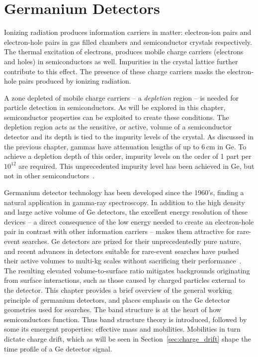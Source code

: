 \chapter{Germanium Detectors}\label{chap:gedet}
Ionizing radiation produces information carriers in matter: electron-ion pairs and electron-hole pairs in gas filled chambers and semiconductor crystals respectively. The thermal excitation of electrons, produces mobile charge carriers (electrons and holes) in semiconductors as well. Impurities in the crystal lattice further contribute to this effect. The presence of these charge carriers masks the electron-hole pairs produced by ionizing radiation. 

A zone depleted of mobile charge carriers -- a \textit{depletion} region -- is needed for particle detection in semiconductors. As will be explored in this chapter, semiconductor properties can be exploited to create these conditions. The depletion region acts as the sensitive, or active, volume of a semiconductor detector and its depth is tied to the impurity levels of the crystal. As discussed in the previous chapter, gammas have attenuation lengths of up to 6\,cm in Ge. To achieve a depletion depth of this order, impurity levels on the order of 1 part per $10^{12}$ are required. This unprecedented impurity level has been achieved in Ge, but not in other semiconductors~\cite{knoll}. 

Germanium detector technology has been developed since the 1960's, finding a natural application in gamma-ray spectroscopy. In addition to the high density and large active volume of Ge detectors, the excellent energy resolution of these devices -- a direct consequence of the low energy needed to create an electron-hole pair in contrast with other information carriers -- makes them attractive for rare-event searches. Ge detectors are prized for their unprecedentedly pure nature, and recent advances in detectors suitable for rare-event searches have pushed their active volumes to multi-kg scales without sacrificing their performance~\cite{icpc,icpc_psd}. The resulting elevated volume-to-surface ratio mitigates backgrounds originating from surface interactions, such as those caused by charged particles external to the detector. This chapter provides a brief overview of the general working principle of germanium detectors, and places emphasis on the Ge detector geometries used for \novbb{} searches. The band structure is at the heart of how semiconductors function. Thus band structure theory is introduced, followed by some its emergent properties: effective mass and mobilities. Mobilities in turn dictate charge drift, which as will be seen in Section~\ref{sec:charge_drift} shape the time profile of a Ge detector signal. 

